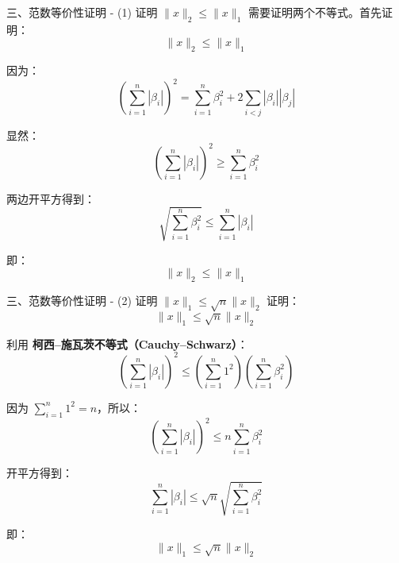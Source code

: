 \documentclass[aspectratio=169]{beamer}
\begin{document}
\begin{frame}{三、范数等价性证明 - (1) 证明 $\|x\|_2 \le \|x\|_1$}
    需要证明两个不等式。首先证明：$$ \|x\|_2 \le \|x\|_1 $$
    
    因为：
    $$ \left(\sum_{i=1}^{n}|\beta_i|\right)^2 = \sum_{i=1}^{n}\beta_i^2 +2\sum_{i<j}|\beta_i||\beta_j| $$
    
    显然：
    $$ \left(\sum_{i=1}^{n}|\beta_i|\right)^2 \ge \sum_{i=1}^{n}\beta_i^2 $$
    
    两边开平方得到：
    $$ \sqrt{\sum_{i=1}^{n}\beta_i^2} \le \sum_{i=1}^{n}|\beta_i| $$
    
    即：
    $$ \|x\|_2 \le \|x\|_1 $$
\end{frame}

\begin{frame}{三、范数等价性证明 - (2) 证明 $\|x\|_1 \le \sqrt{n}\|x\|_2$}
    证明：$$ \|x\|_1 \le \sqrt{n}\|x\|_2 $$
    
    利用 \textbf{柯西–施瓦茨不等式（Cauchy–Schwarz）}：
    $$ \left(\sum_{i=1}^{n}|\beta_i|\right)^2 \le \left(\sum_{i=1}^{n}1^2\right) \left(\sum_{i=1}^{n}\beta_i^2\right) $$
    
    因为 $\sum_{i=1}^{n}1^2=n$，所以：
    $$ \left(\sum_{i=1}^{n}|\beta_i|\right)^2 \le n\sum_{i=1}^{n}\beta_i^2 $$
    
    开平方得到：
    $$ \sum_{i=1}^{n}|\beta_i| \le \sqrt{n}\sqrt{\sum_{i=1}^{n}\beta_i^2} $$
    
    即：
    $$ \|x\|_1 \le \sqrt{n}\|x\|_2 $$
\end{frame}
\end{document}
